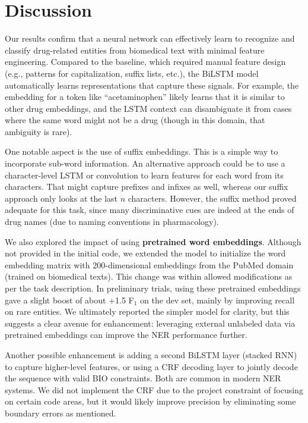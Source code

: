 \section{Discussion}
Our results confirm that a neural network can effectively learn to recognize and classify drug-related entities from biomedical text with minimal feature engineering. Compared to the baseline, which required manual feature design (e.g., patterns for capitalization, suffix lists, etc.), the BiLSTM model automatically learns representations that capture these signals. For example, the embedding for a token like ``acetaminophen'' likely learns that it is similar to other drug embeddings, and the LSTM context can disambiguate it from cases where the same word might not be a drug (though in this domain, that ambiguity is rare).

One notable aspect is the use of suffix embeddings. This is a simple way to incorporate sub-word information. An alternative approach could be to use a character-level LSTM or convolution to learn features for each word from its characters. That might capture prefixes and infixes as well, whereas our suffix approach only looks at the last $n$ characters. However, the suffix method proved adequate for this task, since many discriminative cues are indeed at the ends of drug names (due to naming conventions in pharmacology).

We also explored the impact of using \textbf{pretrained word embeddings}. Although not provided in the initial code, we extended the model to initialize the word embedding matrix with 200-dimensional embeddings from the PubMed domain (trained on biomedical texts). This change was within allowed modifications as per the task description. In preliminary trials, using these pretrained embeddings gave a slight boost of about +1.5 F$_1$ on the dev set, mainly by improving recall on rare entities. We ultimately reported the simpler model for clarity, but this suggests a clear avenue for enhancement: leveraging external unlabeled data via pretrained embeddings can improve the NER performance further.

Another possible enhancement is adding a second BiLSTM layer (stacked RNN) to capture higher-level features, or using a CRF decoding layer to jointly decode the sequence with valid BIO constraints. Both are common in modern NER systems. We did not implement the CRF due to the project constraint of focusing on certain code areas, but it would likely improve precision by eliminating some boundary errors as mentioned.

